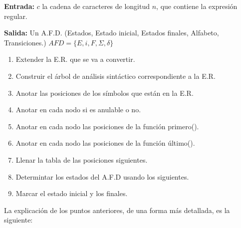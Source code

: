 \documentclass{report}
\begin{document}
{\bf Entrada:} $c$ la cadena de caracteres de longitud $n$, que contiene la expresión regular.

{\bf Salida:} Un A.F.D. (Estados, Estado inicial, Estados finales, Alfabeto, Transiciones.) $AFD=\{E,i,F,\Sigma,\delta\}$
\begin{enumerate}
	\item Extender la E.R. que se va a convertir.
	\item Construir el árbol de análisis sintáctico correspondiente a la E.R.
	\item Anotar las posiciones de los símbolos que están en la E.R.
	\item Anotar en cada nodo si es anulable o no.
	\item Anotar en cada nodo las posiciones de la función primero().
	\item Anotar en cada nodo las posiciones de la función último().
	\item Llenar la tabla de las posiciones siguientes.
	\item Determintar los estados del A.F.D usando los siguientes.
	\item Marcar el estado inicial y los finales.
\end{enumerate}
La explicación de los puntos anteriores, de una forma más detallada, es la siguiente:
\end{document}
